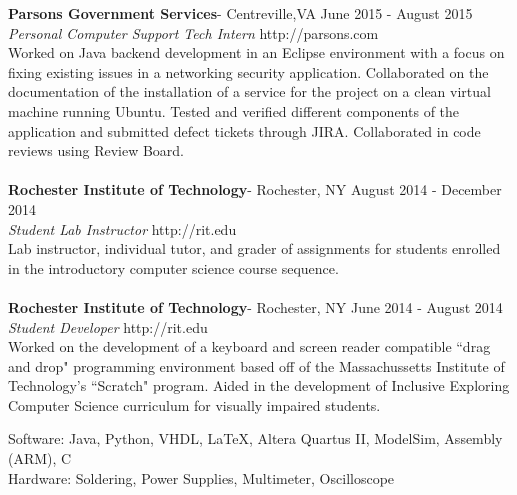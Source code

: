 \documentclass[9pt]{article} %
\begin{document}
{
\newline
	\textbf{Parsons Government Services}- Centreville,VA			\hfill June 2015 - August 2015
	\\ \textit{Personal Computer Support Tech Intern}	\hfill http://parsons.com
	\\ \indent Worked on Java backend development in an Eclipse environment with a focus on fixing existing issues in a networking security application.  Collaborated on the documentation of the installation of a service for the project on a clean virtual machine running Ubuntu.  Tested and verified different components of the application and submitted defect tickets through JIRA.  Collaborated in code reviews using Review Board.
	\\    
	\\	
	\textbf{Rochester Institute of Technology}- Rochester, NY 		\hfill August 2014 - December 2014
	\\ \textit{Student Lab Instructor}								\hfill http://rit.edu
	\\ \indent Lab instructor, individual tutor, and grader of assignments for students enrolled in the introductory computer science course sequence.   
	\\	
	\\ \textbf{Rochester Institute of Technology}- Rochester, NY 	\hfill June 2014 - August 2014
	\\ \textit{Student Developer}									\hfill http://rit.edu
	\\ \indent Worked on the development of a keyboard and screen reader compatible ``drag and drop" programming environment based off of the Massachussetts Institute of Technology's ``Scratch" program.  Aided in the development of Inclusive Exploring Computer Science curriculum for visually impaired students.


\bigskip


\newline
	Software: Java, Python, VHDL, \LaTeX, Altera Quartus II, ModelSim, Assembly (ARM), C\\
	Hardware: Soldering, Power Supplies, Multimeter, Oscilloscope

}
\end{document}

